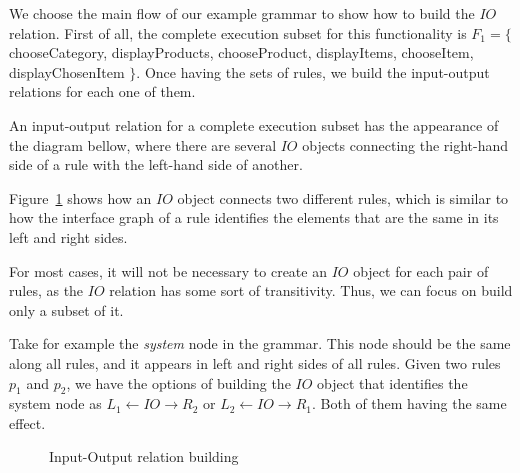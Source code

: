   We choose the main flow of our example grammar to show how to build the $IO$ relation. First of all, the complete execution subset for this functionality is $F_1 = \{$ chooseCategory, displayProducts, chooseProduct, displayItems, chooseItem, displayChosenItem $\}$. Once having the sets of rules, we build the input-output relations for each one of them.

\begin{example}\label{ex:inout}  An input-output relation for a complete execution subset has the appearance of the diagram bellow, where there are several $IO$ objects connecting the right-hand side of a rule with the left-hand side of another.

    Figure~\ref{fig:tests:inout} shows how an $IO$ object connects two different rules, which is similar to how the interface graph of a rule identifies the elements that are the same in its left and right sides.

\hfill\break

  For most cases, it will not be necessary to create an $IO$ object for each pair of rules, as the $IO$ relation has some sort of transitivity. Thus, we can focus on build only a subset of it.

  Take for example the \emph{system} node in the grammar. This node should be the same along all rules, and it appears in left and right sides of all rules. Given two rules $p_1$ and $p_2$, we have the options of building the $IO$ object that identifies the system node as $L_1 \leftarrow IO \rightarrow R_2$ or $L_2 \leftarrow IO \rightarrow R_1$. Both of them having the same effect. 

\begin{figure}[!ht]
  \centering
  \caption{Input-Output relation building}\label{fig:tests:inout}
\end{figure}

\end{example}

